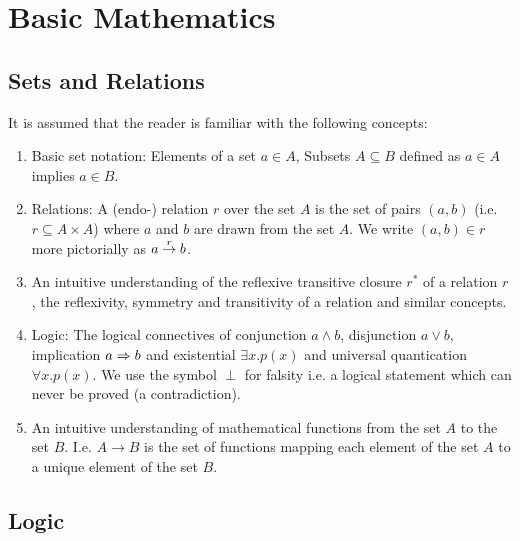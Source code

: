 \section{Basic Mathematics}
\label{sec:BasicMathematics}

\begin{comment}
    - Logic:
        - Rule notation
        - Universal quantification

    - Inductive Sets
\end{comment}



\subsection{Sets and Relations}

It is assumed that the reader is familiar with the following concepts:

\begin{enumerate}

\item Basic set notation: Elements of a set $a \in A$, Subsets $A \subseteq B$
defined as $a \in A$ implies $a \in B$.

\item Relations: A (endo-) relation $r$ over the set $A$ is the set of pairs
$(a,b)$ (i.e. $r \subseteq A \times A$) where $a$ and $b$ are drawn from the set
$A$. We write $(a,b) \in r$ more pictorially as $a \stackrel{r}{\to} b$.

\item An intuitive understanding of the reflexive transitive closure $r^*$ of a
relation $r$, the reflexivity, symmetry and transitivity of a relation and
similar concepts.

\item Logic: The logical connectives of conjunction $a \land b$, disjunction $a
\lor b$, implication $a \Rightarrow b$ and existential $\exists x. p(x)$ and universal
quantication $\forall x.p(x)$. We use the symbol $\perp$ for falsity i.e. a
logical statement which can never be proved (a contradiction).

\item An intuitive understanding of mathematical functions from the set $A$ to
the set $B$. I.e. $A \to B$ is the set of functions mapping each element of the
set $A$ to a unique element of the set $B$.
\end{enumerate}





\subsection{Logic}

